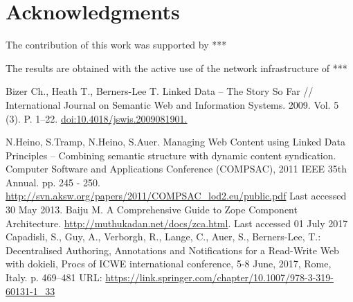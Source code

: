 \documentclass[12pt]{llncs}
\begin{document}
\section{Acknowledgments}
The contribution of this work was supported by ***

The results are obtained with the active use of the network
infrastructure of ***

\begin{thebibliography}{99}
 Bizer Ch., Heath T., Berners-Lee T. Linked Data -- The Story So
  Far // International Journal on Semantic Web and Information Systems.
  2009. Vol. 5 (3). P. 1--22. \url{doi:10.4018/jswis.2009081901. }

 N.Heino, S.Tramp, N.Heino, S.Auer. Managing Web Content using Linked Data Principles – Combining semantic structure with dynamic content syndication. Computer Software and Applications Conference (COMPSAC), 2011 IEEE 35th Annual. pp. 245 - 250.  \url{http://svn.aksw.org/papers/2011/COMPSAC_lod2.eu/public.pdf}  Last accessed 30 May 2013.
  Baiju M. A Comprehensive Guide to Zope Component Architecture.
\url{http://muthukadan.net/docs/zca.html}. Last accessed 01 July 2017
  Capadisli, S., Guy, A., Verborgh, R., Lange, C., Auer, S., Berners-Lee, T.: Decentralised Authoring, Annotations and Notifications for a Read-Write Web with dokieli, Procs of ICWE international conference, 5-8 June, 2017, Rome, Italy. p. 469--481 URL: \url{https://link.springer.com/chapter/10.1007/978-3-319-60131-1_33}




\end{thebibliography}
\end{document}
